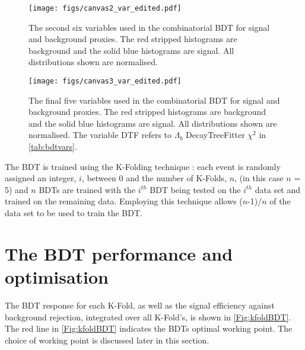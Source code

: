     \begin{figure}[!ht]\def\nh{0.6\textwidth}
  \centering
  \hspace*{-2cm}
  \texttt{[image: figs/canvas2\_var\_edited.pdf]}

  \caption{The second six variables used in the combinatorial BDT for signal and background proxies. The red stripped histograms are background and the solid blue histograms are signal. All distributions shown are normalised.}
  \label{Fig:bdtvar2}
    \end{figure}
    \FloatBarrier
    \begin{figure}[!ht]\def\nh{0.65\textwidth}
  \centering
  \hspace*{-1cm}
  \texttt{[image: figs/canvas3\_var\_edited.pdf]}

  \caption{The final five variables used in the combinatorial BDT for signal and background proxies. The red stripped histograms are background and the solid blue histograms are signal.  All distributions shown are normalised. The variable \Lb DTF \chisq refers to $\Lambda_{b}$ DecayTreeFitter $\chi^{2}$ in \autoref{tab:bdtvars}. }
  
  \label{Fig:bdtvar3}
    \end{figure}
    \FloatBarrier
   
    The BDT is trained using the K-Folding technique \cite{kfold}: each event is randomly assigned an integer, $i$, between 0 and the number of K-Folds, $n$, (in this case $n$ = 5) and $n$ BDTs are trained with the $i^{th}$ BDT being tested on the $i^{th}$ data set and trained on the remaining data. Employing this technique allows ($n$-1)/$n$ of the data set to be used to train the BDT. 





\section{The BDT performance and optimisation}
\label{sec:opt}
The BDT response for each K-Fold, as well as the signal efficiency against background rejection, integrated over all K-Fold's, is shown in \autoref{Fig:kfoldBDT}. The red line in \autoref{Fig:kfoldBDT}\protect{} indicates the BDTs optimal working point. The choice of working point is discussed later in this section.


